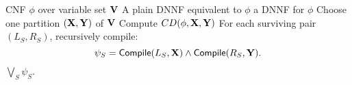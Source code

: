 %
\begin{algorithmic}[1]
\Require CNF $\phi$ over variable set $\mathbf{V}$
\Ensure A plain DNNF equivalent to $\phi$
\State \Return a DNNF for $\phi$
\EndIf
\State Choose one partition $(\mathbf{X},\mathbf{Y})$ of $\mathbf{V}$
\State Compute $CD(\phi,\mathbf{X},\mathbf{Y})$
\State For each surviving pair $(L_{S},R_{S})$, recursively compile:
\[
\psi_{S} = \mathsf{Compile}(L_{S}, \mathbf{X}) \wedge \mathsf{Compile}(R_{S}, \mathbf{Y}).
\]
\State \Return $\bigvee_{S} \psi_{S}$.
\end{algorithmic}


